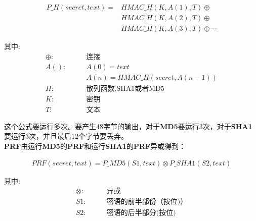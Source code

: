 \documentclass[11pt,dvips]{article}
\newcommand{\bfs}[1]{{\bf{#1}}}
\begin{document}
\begin{eqnarray}
        P\_H(secret, text) =& HMAC\_H(K,A(1),T)\oplus {} \nonumber\\
                           &HMAC\_H(K,A(2),T)\oplus  \nonumber \\
                           &HMAC\_H(K,A(3),T)\oplus \cdots \nonumber
\end{eqnarray}

\begin{center}
\begin{minipage}[t]{0.4\textwidth}
        其中:
\begin{align*}
        \oplus:\qquad &\text{连接}\\
            A():\qquad &A(0) = text {} \\
                 \qquad& A(n) = HMAC\_H(secret,A(n-1)) {} \\
              H: \qquad &\text{散列函数,SHA1或者MD5} {}\\
              K: \qquad &\text{密钥} {}\\
              T: \qquad &\text{文本} {}
\end{align*}
\end{minipage}
\end{center}

这个公式要运行多次。要产生48字节的输出，对于\bfs{MD5}要运行3次，对于\bfs{SHA1}要运行3次，并且最后12个字节要丢弃。\\

\bfs{PRF}由运行\bfs{MD5}的\bfs{PRF}和运行\bfs{SHA1}的\bfs{PRF}异或得到：

\begin{eqnarray}
        PRF(secret,text) =  P\_MD5(S1,text) \otimes P\_SHA1(S2,text) \nonumber
\end{eqnarray}

\begin{center}
        \begin{minipage}[t]{0.4\textwidth}
               其中:
               \begin{align*}
                       \otimes:\qquad &\text{异或} \\
                            S1:\qquad &\text{密语的前半部份（按位)}）\\
                            S2:\qquad &\text{密语的后半部分(按位)}
               \end{align*}

       \end{minipage}
\end{center}
\end{document}
